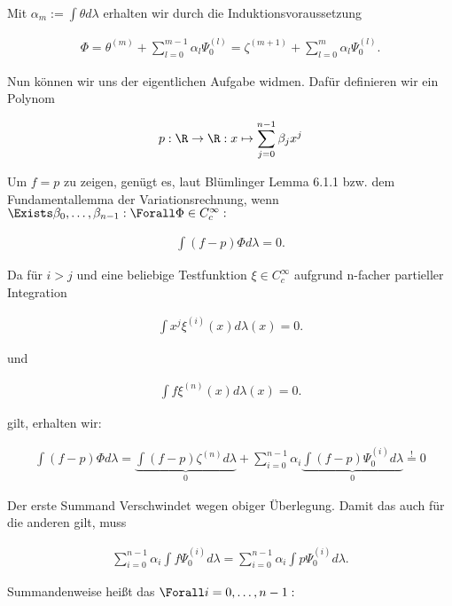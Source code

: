 \begin{solution}
Mit $\alpha_m:=\int\theta d\lambda$ erhalten wir durch die Induktionsvoraussetzung

\begin{align*}
  \Phi
  = \theta^{(m)} +
    \sum_{l=0}^{m-1}
    \alpha_l \Psi_0^{(l)}
  = \zeta^{(m+1)} +
    \sum_{l=0}^{m}
    \alpha_l \Psi_0^{(l)}.
\end{align*}

Nun können wir uns der eigentlichen Aufgabe widmen. Dafür definieren wir ein Polynom

\begin{align*}
    p: \R \to \R: x \mapsto \sum_{j=0}^{n-1} \beta_j x^j
\end{align*}

Um $f = p$ zu zeigen, genügt es, laut Blümlinger Lemma 6.1.1 bzw. dem Fundamentallemma der Variationsrechnung, wenn $\Exists \beta_0, \dots, \beta_{n-1}: \Forall \Phi \in C_c^\infty:$

\begin{align}
    \int (f-p) \Phi d \lambda = 0. \label{eq:wunsch}
\end{align}

Da für $i>j$ und eine beliebige Testfunktion $\xi \in C_c^\infty$ aufgrund n-facher partieller Integration

\begin{align*}
    \int x^j \xi^{(i)}(x) d \lambda(x) = 0.
\end{align*}

und

\begin{align*}
    \int f \xi^{(n)}(x) d \lambda(x) = 0.
\end{align*}

gilt, erhalten wir:

\begin{align*}
  \int (f-p) \Phi d \lambda
  = \underbrace{\int (f-p) \zeta^{(n)} d \lambda}_0 +
    \sum_{i=0}^{n-1} \alpha_i
    \underbrace{\int(f-p) \Psi_0^{(i)} d \lambda}_0
  \stackrel{!}{=} 0
\end{align*}

Der erste Summand Verschwindet wegen obiger Überlegung. Damit das auch für die anderen gilt, muss

\begin{align*}
    \sum_{i=0}^{n-1} \alpha_i
    \int f \Psi_0^{(i)} d \lambda =
    \sum_{i=0}^{n-1}
    \alpha_i
    \int p \Psi_0^{(i)} d \lambda.
\end{align*}

Summandenweise heißt das $\Forall i = 0, \dots, n-1:$


\end{solution}
